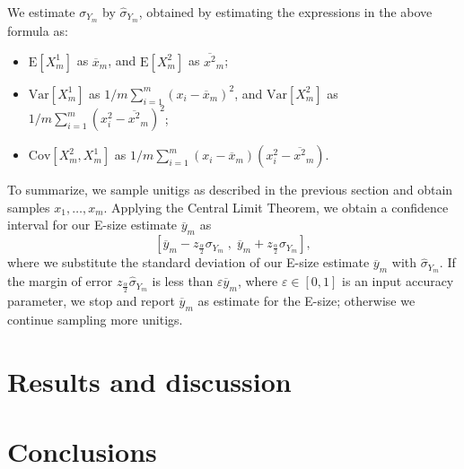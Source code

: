 \documentclass[a4paper,11pt]{article}
\newcommand{\Var}{\text{Var}}
\newcommand{\Cov}{\text{Cov}}
\newcommand{\E}{\text{E}}
\begin{document}
We estimate $\sigma_{Y_m}$ by $\hat{\sigma}_{Y_m}$, obtained by estimating the expressions in the above formula as:
\begin{itemize}
\item $\E[X^1_m]$ as $\overline{x}_m$, and $\E[X^2_m]$ as $\overline{x^2}_m$;
\item $\Var[X^1_m]$ as $1/m \sum_{i = 1}^{m} (x_i - \overline{x}_m)^2$, and $\Var[X^2_m]$ as $1/m \sum_{i = 1}^{m} (x_i^2 - \overline{x^2}_m)^2$;
\item $\Cov[X^2_m,X^1_m]$ as $1/m \sum_{i=1}^{m} (x_i - \overline{x}_m)(x_i^2 - \overline{x^2}_m)$. 

\end{itemize}

To summarize, we sample unitigs as described in the previous section and obtain samples $x_1,\dots, x_m$. Applying the Central Limit Theorem, we obtain a confidence interval for our E-size estimate $\overline{y}_m$ as 
\[\left[\overline{y}_m - z_{\frac{\alpha}{2}}\sigma_{Y_m} \;,\; \overline{y}_m + z_{\frac{\alpha}{2}}\sigma_{Y_m}\right], \]
where we substitute the standard deviation of our E-size estimate $\overline{y}_m$ with $\hat{\sigma}_{Y_m}$. If the margin of error $z_{\frac{\alpha}{2}}\hat{\sigma}_{Y_m}$ is less than $\varepsilon \overline{y}_m$, where $\varepsilon \in [0,1]$ is an input accuracy parameter, we stop and report $\overline{y}_m$ as estimate for the E-size; otherwise we continue sampling more unitigs.

\section{Results and discussion} %
\label{sec:results_and_discussion}


\section{Conclusions} %
\label{sec:conclusions}




\end{document}
